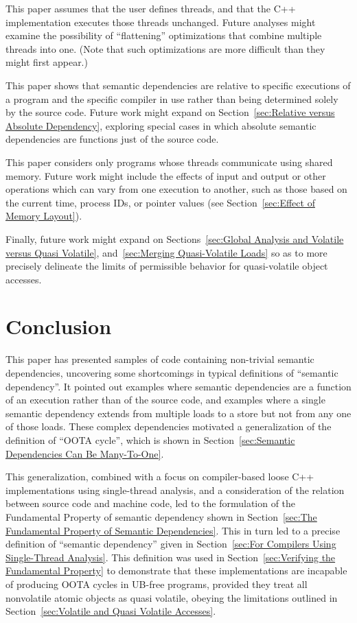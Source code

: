 \documentclass[10]{article}
\begin{document}
This paper assumes that the user defines threads, and that the
C++ implementation executes those threads unchanged.
Future analyses might examine the possibility of ``flattening''
optimizations that combine multiple threads into one.
(Note that such optimizations are more difficult than they might first appear.)

This paper shows that semantic dependencies are relative to specific
executions of a program and the specific compiler in use rather than
being determined solely by the source code.
Future work might expand on
Section~\ref{sec:Relative versus Absolute Dependency},
exploring special cases in which absolute semantic dependencies are
functions just of the source code.

This paper considers only programs whose threads
communicate using shared memory.
Future work might include the effects of input and output or
other operations which can vary from one execution to another,
such as those based on the current time, process IDs, or pointer values
(see Section~\ref{sec:Effect of Memory Layout}).

Finally, future work might expand on
Sections~\ref{sec:Global Analysis and Volatile versus Quasi Volatile},
and~\ref{sec:Merging Quasi-Volatile Loads}
so as to more precisely delineate the limits of permissible
behavior for quasi-volatile object accesses.

\section{Conclusion}
\label{sec:Conclusion}

This paper has presented samples of code containing non-trivial
semantic dependencies, uncovering some shortcomings in typical definitions of
``semantic dependency''.
It pointed out examples where semantic dependencies
are a function of an execution rather than of the source code, and examples
where a single semantic dependency extends from multiple loads
to a store but not from any one of those loads.
These complex dependencies motivated a generalization of the definition
of ``OOTA cycle'', which is shown in
Section~\ref{sec:Semantic Dependencies Can Be Many-To-One}.

This generalization, combined with a focus on compiler-based loose C++
implementations using single-thread analysis, and a consideration of
the relation between source code and machine code, led to the formulation
of the Fundamental Property of semantic dependency shown in
Section~\ref{sec:The Fundamental Property of Semantic Dependencies}.
This in turn led to a precise definition of ``semantic dependency'' given in
Section~\ref{sec:For Compilers Using Single-Thread Analysis}.
This definition was used in
Section~\ref{sec:Verifying the Fundamental Property}
to demonstrate that these implementations are
incapable of producing OOTA cycles in UB-free programs,
provided they treat all nonvolatile atomic objects as
quasi volatile, obeying the limitations outlined in
Section~\ref{sec:Volatile and Quasi Volatile Accesses}.
\end{document}
